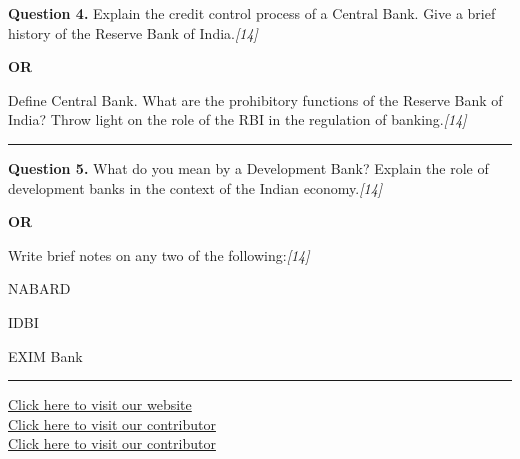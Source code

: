 \documentclass[11pt,a4paper]{article}
\newcommand{\pts}[1]{\hfill   \textit{[#1]}}
\begin{document}
\noindent   \textbf{Question 4.}
Explain the credit control process of a Central Bank. Give a brief history of the Reserve Bank of India.\pts{14}

\centerline{   \textbf{OR}}

Define Central Bank. What are the prohibitory functions of the Reserve Bank of India? Throw light on the role of the RBI in the regulation of banking.\pts{14}

\medskip\rule{\linewidth}{0.2pt}




\noindent   \textbf{Question 5.}
What do you mean by a Development Bank? Explain the role of development banks in the context of the Indian economy.\pts{14}

\centerline{   \textbf{OR}}

Write brief notes on any two of the following:\pts{14}

\begin{parts}
  \item NABARD
  \item IDBI
  \item EXIM Bank
\end{parts}

\vfill
\rule{\linewidth}{0.4pt}

\begin{center}\small
\href{https://bhu-exam.vercel.app/}{Click here to visit our website}\\[4pt]
\href{https://me-aryan.vercel.app/}{Click here to visit our contributor}\\[4pt]
\href{https://quashan-me.vercel.app/}{Click here to visit our contributor}
\end{center}
\end{document}
